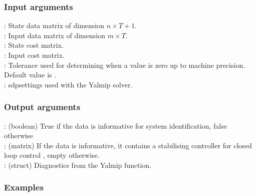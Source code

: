 \subsubsection*{Input arguments}
\textbf{}: State data matrix of dimension $n \times T+1$.\\
\textbf{}: Input data matrix of dimension $m \times T$.\\
\textbf{}: State cost matrix.\\
\textbf{}: Input cost matrix.\\
\textbf{}: Tolerance used for determining when a value is zero up to machine precision. Default value is .\\
\textbf{}: sdpsettings used with the Yalmip solver.

\subsubsection*{Output arguments}
\textbf{}: (boolean) True if the data is informative for system identification, false otherwise\\
\textbf{}: (matrix) If the data is informative, it contains a stabilising controller  for closed loop control , empty otherwise.\\
\textbf{}: (struct) Diagnostics from the Yalmip  function.


\subsubsection{Examples}

